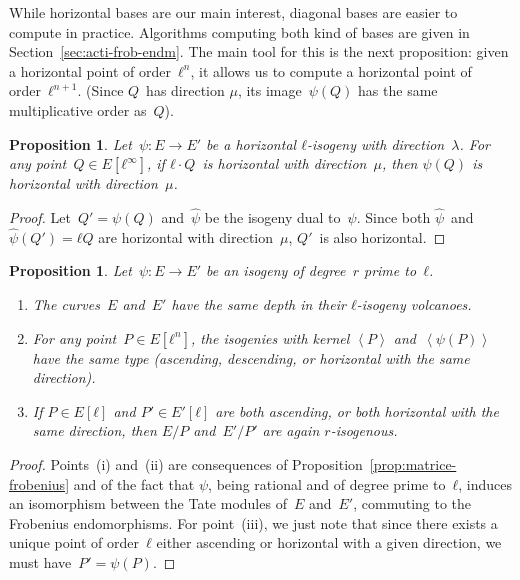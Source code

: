 \documentclass{lms}
\newtheorem{prop}[thm]{Proposition}
\def\chev#1{\left\langle#1\right\rangle}
\begin{document}
While horizontal bases are our main interest,
diagonal bases are easier to compute in practice.
Algorithms computing both kind of bases
are given in Section~\ref{sec:acti-frob-endm}.
The main tool for this is the next proposition:
given a horizontal point of order~$ℓ^n$,
it allows us to compute a horizontal point of order~$ℓ^{n+1}$.
(Since $Q$~has direction $μ$,
its image~$ψ(Q)$ has the same multiplicative order as~$Q$).

\begin{prop}\label{prop:push-horizontal}
Let~$ψ: E → E'$ be a horizontal $ℓ$-isogeny with direction~$λ$.
For any point~$Q ∈ E[ℓ^∞]$,
if $ℓ · Q$~is horizontal with direction~$μ$,
then $ψ(Q)$ is horizontal with direction~$μ$.
\end{prop}
\begin{proof}
Let~$Q' = ψ(Q)$ and~$\widehat{ψ}$ be the isogeny dual to~$ψ$.
Since both $\widehat{ψ}$~and~$\widehat{ψ}(Q') = ℓ Q$ are horizontal
with direction~$μ$, $Q'$~is also horizontal.
\end{proof}
\begin{prop}\label{prop:parallel}
Let~$ψ: E → E'$ be an isogeny of degree~$r$ prime to~$ℓ$.
\begin{enumerate}
\item The curves~$E$ and~$E'$ have the same depth
in their $ℓ$-isogeny volcanoes.
\item For any point~$P ∈ E[ℓ^n]$,
the isogenies with kernel $\chev{P}$ and~$\chev{ψ(P)}$ have the same type
(ascending, descending, or horizontal with the same direction).
\item If $P ∈ E[ℓ]$ and $P' ∈ E'[ℓ]$ are both ascending,
or both horizontal with the same direction,
then $E/P$ and~$E'/P'$ are again $r$-isogenous.
\end{enumerate}
\end{prop}
\begin{proof}
Points~(i) and~(ii) are consequences of Proposition~\ref{prop:matrice-frobenius}
and of the fact that $ψ$, being rational and of degree prime to~$ℓ$,
induces an isomorphism between the Tate modules of~$E$ and~$E'$,
commuting to the Frobenius endomorphisms.
For point~(iii), we just note that
since there exists a unique point of order~$ℓ$
either ascending or horizontal with a given direction,
we must have~$P' = ψ(P)$.
\end{proof}

\end{document}
